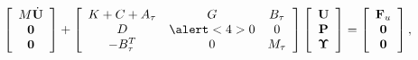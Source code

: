 \begin{frame}
\begin{itemize}
\begin{equation*}
\left[\begin{array}{c}
M\dot{\U}\\
\mathbf{0}\\
\mathbf{0}
\end{array}\right]+\left[\begin{array}{ccc}
K+C+A_\tau&G&B_\tau\\
D&\alert<4>{0}&0\\
-B_\tau^T&0&M_\tau
\end{array}\right]\left[\begin{array}{c}
\U\\
\P\\
\ETA
\end{array}\right]=\left[\begin{array}{c}
\F_u\\
\mathbf{0}\\
\mathbf{0}
\end{array}\right],
\end{equation*}
\end{itemize}
\vspace{-0.2cm}
\end{frame}
